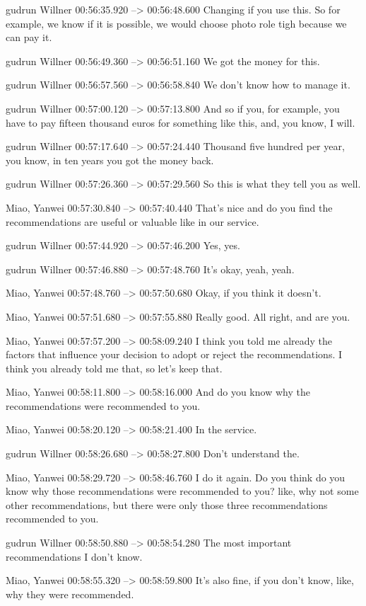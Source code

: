 {gudrun Willner 00:56:35.920 --> 00:56:48.600
Changing if you use this. So for example, we know if it is possible, we would choose photo role tigh because we can pay it.

gudrun Willner 00:56:49.360 --> 00:56:51.160
We got the money for this.

gudrun Willner 00:56:57.560 --> 00:56:58.840
We don't know how to manage it.

gudrun Willner 00:57:00.120 --> 00:57:13.800
And so if you, for example, you have to pay fifteen thousand euros for something like this, and, you know, I will.

gudrun Willner 00:57:17.640 --> 00:57:24.440
Thousand five hundred per year, you know, in ten years you got the money back.

gudrun Willner 00:57:26.360 --> 00:57:29.560
So this is what they tell you as well.

Miao, Yanwei 00:57:30.840 --> 00:57:40.440
That's nice and do you find the recommendations are useful or valuable like in our service.

gudrun Willner 00:57:44.920 --> 00:57:46.200
Yes, yes.

gudrun Willner 00:57:46.880 --> 00:57:48.760
It's okay, yeah, yeah.

Miao, Yanwei 00:57:48.760 --> 00:57:50.680
Okay, if you think it doesn't.

Miao, Yanwei 00:57:51.680 --> 00:57:55.880
Really good. All right, and are you.

Miao, Yanwei 00:57:57.200 --> 00:58:09.240
I think you told me already the factors that influence your decision to adopt or reject the recommendations. I think you already told me that, so let's keep that.

Miao, Yanwei 00:58:11.800 --> 00:58:16.000
And do you know why the recommendations were recommended to you.

Miao, Yanwei 00:58:20.120 --> 00:58:21.400
In the service.

gudrun Willner 00:58:26.680 --> 00:58:27.800
Don't understand the.

Miao, Yanwei 00:58:29.720 --> 00:58:46.760
I do it again. Do you think do you know why those recommendations were recommended to you? like, why not some other recommendations, but there were only those three recommendations recommended to you.

gudrun Willner 00:58:50.880 --> 00:58:54.280
The most important recommendations I don't know.

Miao, Yanwei 00:58:55.320 --> 00:58:59.800
It's also fine, if you don't know, like, why they were recommended.

}
